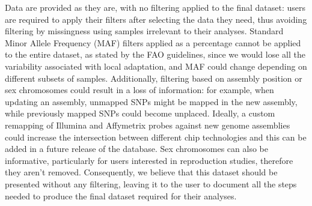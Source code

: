 \documentclass[a4paper,num-refs,gigabyte]{oup-contemporary}
\begin{document}
Data are provided as they are, with no filtering applied to the final dataset: users are required to apply their filters after selecting the data they need, thus avoiding filtering by missingness using samples irrelevant to their analyses. Standard Minor Allele Frequency (MAF) filters applied as a percentage cannot be applied to the entire dataset, as stated by the FAO guidelines\citep{Ajmone23}, since we would lose all the variability associated with local adaptation, and MAF could change depending on different subsets of samples. Additionally, filtering based on assembly position or sex chromosomes could result in a loss of information: for example, when updating an assembly, unmapped SNPs might be mapped in the new assembly, while previously mapped SNPs could become unplaced. Ideally, a custom remapping of Illumina and Affymetrix probes against new genome assemblies could increase the intersection between different chip technologies and this can be added in a future release of the database. Sex chromosomes can also be informative, particularly for users interested in reproduction studies, therefore they aren't removed. Consequently, we believe that this dataset should be presented without any filtering, leaving it to the user to document all the steps needed to produce the final dataset required for their analyses.
\end{document}
